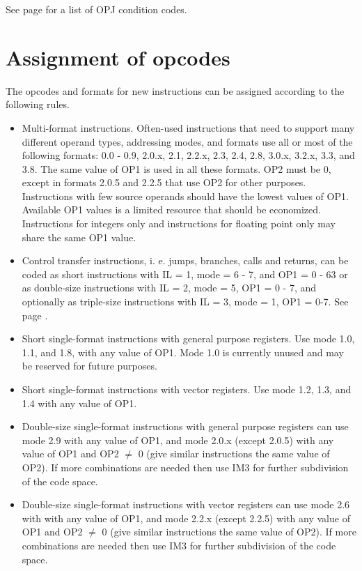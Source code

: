 \documentclass[forwardcom.tex]{subfiles}
\begin{document}
See page \pageref{table:controlTransferInstructions} for a list of OPJ condition codes.
\vv


\section{Assignment of opcodes}
The opcodes and formats for new instructions can be assigned according to the following rules.

\begin{itemize}
\item Multi-format instructions. Often-used instructions that need to support many different operand types, addressing modes, and formats use all or most of the following formats: 0.0 - 0.9, 2.0.x, 2.1, 2.2.x, 2.3, 2.4, 2.8, 3.0.x, 3.2.x, 3.3, and 3.8. The same value of OP1 is used in all these formats. OP2 must be 0, except in formats 2.0.5 and 2.2.5 that use OP2 for other purposes. Instructions with few source operands should have the lowest values of OP1. Available OP1 values is a limited resource that should be economized. Instructions for integers only and instructions for floating point only may share the same OP1 value.

\item Control transfer instructions, i. e. jumps, branches, calls and returns, can be coded as short instructions with IL = 1, mode = 6 - 7, and OP1 = 0 - 63 or as double-size instructions with IL = 2, mode = 5, OP1 = 0 - 7, and optionally as triple-size instructions with IL = 3, mode = 1, OP1 = 0-7. See page \pageref{table:jumpInstructionFormats}.

\item Short single-format instructions with general purpose registers. Use mode 1.0, 1.1, and 1.8, with any value of OP1. Mode 1.0 is currently unused and may be reserved for future purposes.

\item Short single-format instructions with vector registers. Use mode 1.2, 1.3, and 1.4 with any value of OP1.

\item Double-size single-format instructions with general purpose registers can use mode 2.9 with any value of OP1, and mode 2.0.x (except 2.0.5) with any value of OP1 and OP2 $\neq$ 0 (give similar instructions the same value of OP2). If more combinations are needed then use IM3 for further subdivision of the code space.

\item Double-size single-format instructions with vector registers can use mode 2.6 with with any value of OP1, and mode 2.2.x (except 2.2.5) with any value of OP1 and OP2 $\neq$ 0 (give similar instructions the same value of OP2). If more combinations are needed then use IM3 for further subdivision of the code space.


\end{itemize}
\end{document}
